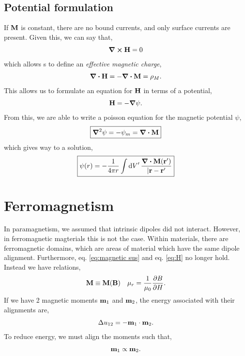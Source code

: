 \documentclass{book}
\begin{document}
\subsection{Potential formulation}
If $\vb{M}$ is constant, there are no bound currents, and only surface currents are present. Given this, we can say that,
\begin{equation}
	\curl{\vb{H}} = 0
\end{equation}
which allows s to define an \textit{effective magnetic charge},
\begin{equation}
	\div{\vb{H}} = - \div{\vb{M}} = \rho_{M}.
\end{equation}
This allows us to formulate an equation for $\vb{H}$ in terms of a potential,
\begin{equation}
	\vb{H} = - \grad \psi.
\end{equation}
From this, we are able to write a poisson equation for the magnetic potential $\psi$,
\begin{equation}
	\boxed{\grad^2\psi = -\psi_m = \div{\vb{M}}} 
\end{equation}
which gives way to a solution,
\begin{equation}
	\boxed{\psi(r) = - \frac{1}{4\pi r}\int \dd{V}' \frac{\div{\vb{M}(\vb{r}')}}{|\vb{r} - \vb{r}'}}
\end{equation}

\section{Ferromagnetism}
In paramagnetism, we assumed that intrinsic dipoles did not interact. However, in ferromagnetic magterials this is not the case. Within materials, there are ferromagnetic domains, which are areas of material which have the same dipole alignment. Furthermore, eq. \eqref{eq:magnetic sus} and eq. \eqref{eq:H} no longer hold. Instead we have relations,
\begin{align}
	\vb{M} \equiv \vb{M}(\vb{B}) && \mu_r = \frac{1}{\mu_0}\pdv{B}{H}.
\end{align} 
If we have 2 magnetic moments $\vb{m}_1$ and $\vb{m}_2$, the energy associated with their alignments are,
\begin{equation}
	\Delta u_{12} = - \vb{m}_1\cdot \vb{m}_2.
\end{equation}
To reduce energy, we must align the moments such that,
\begin{equation}
	\vb{m}_1 \propto \vb{m}_2.
\end{equation}
\end{document}
